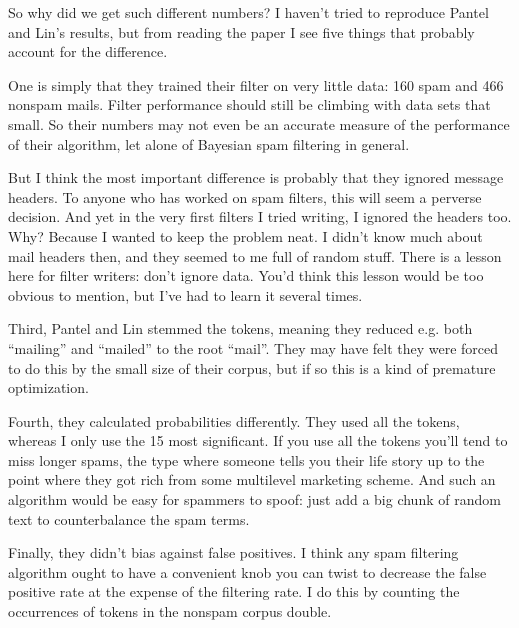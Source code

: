So
                  why did we get such different numbers? I haven't tried to
                  reproduce Pantel and Lin's results, but from reading the paper
                  I see five things that probably account for the difference.

One
                  is simply that they trained their filter on very little data:
                  160 spam and 466 nonspam mails. Filter performance should
                  still be climbing with data sets that small. So their numbers
                  may not even be an accurate measure of the performance of
                  their algorithm, let alone of Bayesian spam filtering in
                  general.

But I think the most important difference
                  is probably that they ignored message headers. To anyone who
                  has worked on spam filters, this will seem a perverse
                  decision. And yet in the very first filters I tried writing, I
                  ignored the headers too. Why? Because I wanted to keep the
                  problem neat. I didn't know much about mail headers then, and
                  they seemed to me full of random stuff. There is a lesson here
                  for filter writers: don't ignore data. You'd think this lesson
                  would be too obvious to mention, but I've had to learn it
                  several times.

Third, Pantel and Lin stemmed the
                  tokens, meaning they reduced e.g. both ``mailing'' and
                  ``mailed'' to the root ``mail''. They may have felt they were
                  forced to do this by the small size of their corpus, but if so
                  this is a kind of premature optimization.

Fourth,
                  they calculated probabilities differently. They used all the
                  tokens, whereas I only use the 15 most significant. If you use
                  all the tokens you'll tend to miss longer spams, the type
                  where someone tells you their life story up to the point where
                  they got rich from some multilevel marketing scheme. And such
                  an algorithm would be easy for spammers to spoof: just add a
                  big chunk of random text to counterbalance the spam terms.

Finally,
                  they didn't bias against false positives. I think any spam
                  filtering algorithm ought to have a convenient knob you can
                  twist to decrease the false positive rate at the expense of
                  the filtering rate. I do this by counting the occurrences of
                  tokens in the nonspam corpus double.
                  

